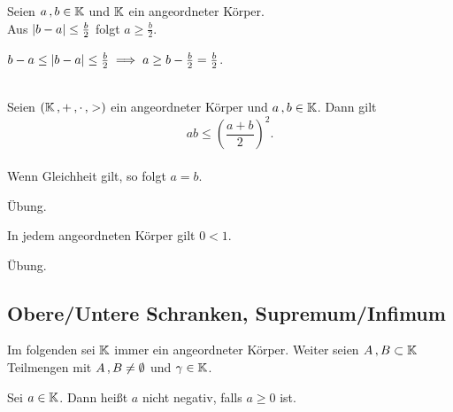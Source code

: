 \documentclass[../ana1.tex]{subfiles}
\begin{document}
\begin{bsp}
	Seien \(a \operatorname{,} b \in \mathbb{K} \) und \(\mathbb{K} \) ein angeordneter Körper. \\
	Aus \(\left|b - a\right| \leq \frac{b}{2} \) folgt \(a \geq \frac{b}{2} \).
\end{bsp}
\begin{bew}
	\(b-a \leq \left|b-a\right| \leq \frac{b}{2} \implies a \geq b - \frac{b}{2} = \frac{b}{2} \).
\end{bew}

\begin{kor}\label{kor:gaungl}\leavevmode \\
	Seien \((\mathbb{K} \operatorname{,} + \operatorname{,} \cdot \operatorname{,} >) \) ein angeordneter Körper und \(a \operatorname{,} b \in \mathbb{K} \). Dann gilt \\
		\[ab \leq {\left( \frac{a + b}{2}\right)}^{2}. \] \\
	Wenn Gleichheit gilt, so folgt \(a=b \).
\end{kor}
\begin{bew}
	Übung.\phantom{\qedhere}
\end{bew}

\begin{bem}
	In jedem angeordneten Körper gilt \(0 < 1 \).
\end{bem}
\begin{bew}
	Übung.\phantom{\qedhere}
\end{bew}


\subsection{Obere/Untere Schranken, Supremum/Infimum}
\begin{prosa}
	Im folgenden sei \(\mathbb{K} \) immer ein angeordneter Körper. Weiter seien \(A \operatorname{,} B \subset \mathbb{K} \) Teilmengen mit \(A \operatorname{,} B \neq \emptyset \) und
	\(\gamma \in \mathbb{K} \).
\end{prosa}

\begin{notation}
	Sei \(a \in \mathbb{K} \). Dann heißt \(a \) nicht negativ, falls \(a \geq 0 \) ist.
\end{notation}
\end{document}
